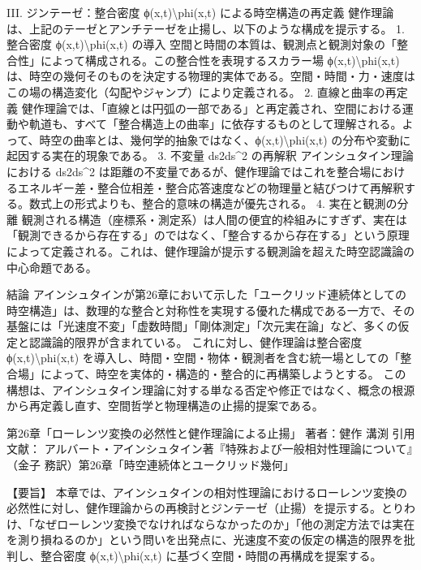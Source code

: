 \documentclass{article}
\begin{document}
III. ジンテーゼ：整合密度 ϕ(x,t)\textbackslash{}phi(x,t) による時空構造の再定義
健作理論は、上記のテーゼとアンチテーゼを止揚し、以下のような構成を提示する。
1. 整合密度 ϕ(x,t)\textbackslash{}phi(x,t) の導入
空間と時間の本質は、観測点と観測対象の「整合性」によって構成される。この整合性を表現するスカラー場 ϕ(x,t)\textbackslash{}phi(x,t) は、時空の幾何そのものを決定する物理的実体である。空間・時間・力・速度はこの場の構造変化（勾配やジャンプ）により定義される。
2. 直線と曲率の再定義
健作理論では、「直線とは円弧の一部である」と再定義され、空間における運動や軌道も、すべて「整合構造上の曲率」に依存するものとして理解される。よって、時空の曲率とは、幾何学的抽象ではなく、ϕ(x,t)\textbackslash{}phi(x,t) の分布や変動に起因する実在的現象である。
3. 不変量 ds2ds\textasciicircum{}2 の再解釈
アインシュタイン理論における ds2ds\textasciicircum{}2 は距離の不変量であるが、健作理論ではこれを整合場におけるエネルギー差・整合位相差・整合応答速度などの物理量と結びつけて再解釈する。数式上の形式よりも、整合的意味の構造が優先される。
4. 実在と観測の分離
観測される構造（座標系・測定系）は人間の便宜的枠組みにすぎず、実在は「観測できるから存在する」のではなく、「整合するから存在する」という原理によって定義される。これは、健作理論が提示する観測論を超えた時空認識論の中心命題である。

結論
アインシュタインが第26章において示した「ユークリッド連続体としての時空構造」は、数理的な整合と対称性を実現する優れた構成である一方で、その基盤には「光速度不変」「虚数時間」「剛体測定」「次元実在論」など、多くの仮定と認識論的限界が含まれている。
これに対し、健作理論は整合密度 ϕ(x,t)\textbackslash{}phi(x,t) を導入し、時間・空間・物体・観測者を含む統一場としての「整合場」によって、時空を実体的・構造的・整合的に再構築しようとする。
この構想は、アインシュタイン理論に対する単なる否定や修正ではなく、概念の根源から再定義し直す、空間哲学と物理構造の止揚的提案である。



第26章「ローレンツ変換の必然性と健作理論による止揚」
著者：健作 溝渕
引用文献：
アルバート・アインシュタイン著『特殊および一般相対性理論について』（金子 務訳）第26章「時空連続体とユークリッド幾何」

【要旨】
本章では、アインシュタインの相対性理論におけるローレンツ変換の必然性に対し、健作理論からの再検討とジンテーゼ（止揚）を提示する。とりわけ、「なぜローレンツ変換でなければならなかったのか」「他の測定方法では実在を測り損ねるのか」という問いを出発点に、光速度不変の仮定の構造的限界を批判し、整合密度 ϕ(x,t)\textbackslash{}phi(x,t) に基づく空間・時間の再構成を提案する。
\end{document}
